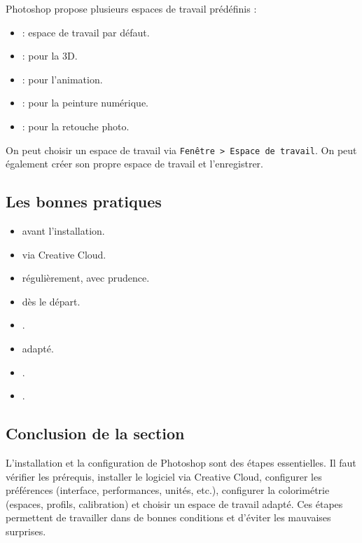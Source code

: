Photoshop propose plusieurs espaces de travail prédéfinis :

\begin{itemize}
    \item {} : espace de travail par défaut.
    \item {} : pour la 3D.
    \item {} : pour l'animation.
    \item {} : pour la peinture numérique.
    \item {} : pour la retouche photo.
\end{itemize}

On peut choisir un espace de travail via \texttt{Fenêtre > Espace de travail}. On peut également créer son propre espace de travail et l'enregistrer.

\subsection{Les bonnes pratiques}

\begin{itemize}
    \item {} avant l'installation.
    \item {} via Creative Cloud.
    \item {} régulièrement, avec prudence.
    \item {} dès le départ.
    \item {}.
    \item {} adapté.
    \item {}.
    \item {}.
\end{itemize}

\subsection*{Conclusion de la section}

L'installation et la configuration de Photoshop sont des étapes essentielles. Il faut vérifier les prérequis, installer le logiciel via Creative Cloud, configurer les préférences (interface, performances, unités, etc.), configurer la colorimétrie (espaces, profils, calibration) et choisir un espace de travail adapté. Ces étapes permettent de travailler dans de bonnes conditions et d'éviter les mauvaises surprises.

